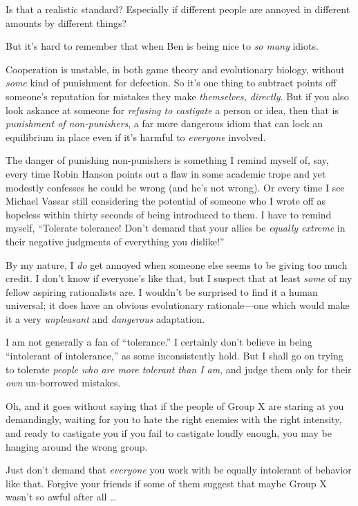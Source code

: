 {
 Is that a realistic standard? Especially if different people are
annoyed in different amounts by different things?}

{
 But it's hard to remember that when Ben is being
nice to \textit{so many} idiots.}

{
 Cooperation is unstable, in both game theory and evolutionary
biology, without \textit{some} kind of punishment for defection. So
it's one thing to subtract points off
someone's reputation for mistakes they make
\textit{themselves, directly}. But if you also look askance at someone
for \textit{refusing to castigate} a person or idea, then that is
\textit{punishment of non-punishers}, a far more dangerous idiom that
can lock an equilibrium in place even if it's harmful
to \textit{everyone} involved.}

{
 The danger of punishing non-punishers is something I remind myself
of, say, every time Robin Hanson points out a flaw in some academic
trope and yet modestly confesses he could be wrong (and
he's not wrong). Or every time I see Michael Vassar
still considering the potential of someone who I wrote off as hopeless
within thirty seconds of being introduced to them. I have to remind
myself, ``Tolerate tolerance! Don't
demand that your allies be \textit{equally extreme} in their negative
judgments of everything you dislike!''}

{
 By my nature, I \textit{do} get annoyed when someone else seems to
be giving too much credit. I don't know if
everyone's like that, but I suspect that at least
\textit{some} of my fellow aspiring rationalists are. I
wouldn't be surprised to find it a human universal; it
does have an obvious evolutionary rationale---one which would make it a
very \textit{unpleasant} and \textit{dangerous} adaptation.}

{
 I am not generally a fan of
``tolerance.'' I certainly
don't believe in being ``intolerant of
intolerance,'' as some inconsistently hold. But I
shall go on trying to tolerate \textit{people who are more tolerant
than I am}, and judge them only for their \textit{own} un-borrowed
mistakes.}

{
 Oh, and it goes without saying that if the people of Group X are
staring at you demandingly, waiting for you to hate the right enemies
with the right intensity, and ready to castigate you if you fail to
castigate loudly enough, you may be hanging around the wrong group.}

{
 Just don't demand that \textit{everyone} you work
with be equally intolerant of behavior like that. Forgive your friends
if some of them suggest that maybe Group X wasn't so
awful after all \ldots}

